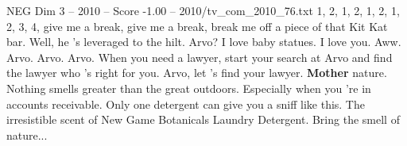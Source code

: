 \begin{textsample}{NEG Dim 3 – 2010 – Score -1.00 – 2010/tv\_com\_2010\_76.txt}  \label{ex:f3_neg_051}
1, 2, 1, 2, 1, 2, 1, 2, 3, 4, give me a break, give me a break, break me off a piece of that Kit Kat bar.
Well, he 's leveraged to the hilt.
Arvo?
I love baby statues.
I love you.
Aww.
Arvo.
Arvo.
Arvo.
When you need a lawyer, start your search at Arvo and find the lawyer who 's right for you.
Arvo, let 's find your lawyer. \textbf{Mother} nature.
Nothing smells greater than the great outdoors.
Especially when you 're in accounts receivable.
Only one detergent can give you a sniff like this.
The irresistible scent of New Game Botanicals Laundry Detergent.
Bring the smell of nature...

\end{textsample}
